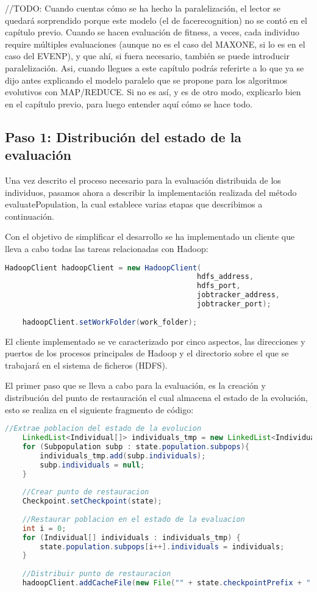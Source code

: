 //TODO: Cuando cuentas cómo se ha hecho la paralelización, el lector se quedará sorprendido porque este modelo (el de facerecognition) no se contó en el capítulo previo. Cuando se hacen evaluación de fitness, a veces, cada individuo require múltiples evaluaciones (aunque no es el caso del MAXONE, si lo es en el caso del EVENP), y que ahí, si fuera necesario, también se puede introducir paralelización. Asi, cuando llegues a este capítulo podrás referirte a lo que ya se dijo antes explicando el modelo paralelo que se propone para los algoritmos evolutivos con MAP/REDUCE. Si no es así, y es de otro modo, explicarlo bien en el capítulo previo, para luego entender aquí cómo se hace todo.

\subsection{Paso 1: Distribución del estado de la evaluación}

Una vez descrito el proceso necesario para la evaluación distribuida de los individuos, pasamos ahora a describir la implementación realizada del método evaluatePopulation, la cual establece varias etapas que describimos a continuación.

Con el objetivo de simplificar el desarrollo se ha implementado un cliente que lleva a cabo todas las tareas relacionadas con Hadoop:

\begin{lstlisting}[language=Java]
	HadoopClient hadoopClient = new HadoopClient(
											hdfs_address,
											hdfs_port,
											jobtracker_address,
											jobtracker_port);
			
	hadoopClient.setWorkFolder(work_folder);
\end{lstlisting}

El cliente implementado se ve caracterizado por cinco aspectos, las direcciones y puertos de los procesos principales de Hadoop y el directorio sobre el que se trabajar\'a en el sistema de ficheros (HDFS).

El primer paso que se lleva a cabo para la evaluación, es la creación y distribución del punto de restauración el cual almacena el estado de la evolución, esto se realiza en el siguiente fragmento de código:

\begin{lstlisting}[language=Java]
	//Extrae poblacion del estado de la evolucion
	LinkedList<Individual[]> individuals_tmp = new LinkedList<Individual[]>();
	for (Subpopulation subp : state.population.subpops){
		individuals_tmp.add(subp.individuals);
		subp.individuals = null;
	}
	
	//Crear punto de restauracion
	Checkpoint.setCheckpoint(state);
	
	//Restaurar poblacion en el estado de la evaluacion
	int i = 0;
	for (Individual[] individuals : individuals_tmp) {
		state.population.subpops[i++].individuals = individuals;
	}
			
	//Distribuir punto de restauracion
	hadoopClient.addCacheFile(new File("" + state.checkpointPrefix + "." + state.generation + ".gz"), true, true);
\end{lstlisting}

